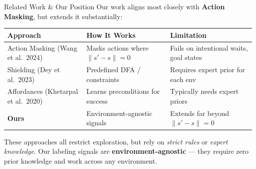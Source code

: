 \documentclass[11pt,aspectratio=169]{beamer}
\begin{document}
\begin{frame}{Related Work \& Our Position}
    Our work aligns most closely with \textbf{Action Masking}, but extends it substantially:

    \vspace{0.2cm}
    \begin{table}[h]
    \centering
    \small
    \begin{tabular}{p{3.2cm}p{4.5cm}p{4.5cm}}
        \toprule
        \textbf{Approach} & \textbf{How It Works} & \textbf{Limitation} \\
        \midrule
        Action Masking \newline (Wang et al.\ 2024) & Masks actions where $\|s' - s\| = 0$ & Fails on intentional waits, goal states \\
        \addlinespace
        Shielding \newline (Dey et al.\ 2023) & Predefined DFA / constraints & Requires expert prior for each env \\
        \addlinespace
        Affordances \newline (Khetarpal et al.\ 2020) & Learns preconditions for success & Typically needs expert priors \\
        \midrule
        \textcolor{contribution}{\textbf{Ours}} & \textcolor{contribution}{Environment-agnostic signals} & \textcolor{contribution}{Extends far beyond $\|s'-s\|=0$} \\
        \bottomrule
    \end{tabular}
    \end{table}

    \vspace{0.2cm}
    These approaches all restrict exploration, but rely on \textit{strict rules} or \textit{expert knowledge}. Our labeling signals are \textbf{environment-agnostic} — they require zero prior knowledge and work across any environment.
\end{frame}
\end{document}
